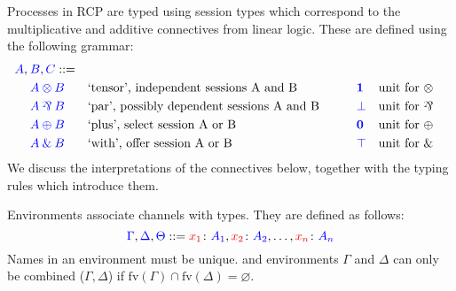 \documentclass[a4paper,UKenglish]{lipics-v2016}
\begin{document}
Processes in RCP are typed using session types which correspond to the
multiplicative and additive connectives from linear logic. These are defined
using the following grammar:
\[
  \begin{aligned}
    \blue{A},\:&\blue{B},\blue{C} ::=\\
    &       \tm{A \tens B} &&\text{`tensor', independent sessions A and B}
    &\qquad&\tm{\one}      &&\text{unit for \tens}\\
    &       \tm{A \parr B} &&\text{`par', possibly dependent sessions A and B}
    &\qquad&\tm{\bot}      &&\text{unit for \parr}\\
    &       \tm{A \plus B} &&\text{`plus', select session A or B}
    &\qquad&\tm{\nil}      &&\text{unit for \plus}\\
    &       \tm{A \with B} &&\text{`with', offer session A or B}
    &\qquad&\tm{\top}      &&\text{unit for \with}
  \end{aligned}
\]
We discuss the interpretations of the connectives below, together with the
typing rules which introduce them.

Environments associate channels with types. They are defined as follows:
\[
  \blue{\Gamma},\blue{\Delta},\blue{\Theta} ::=
  \tm[x_1]{A_1},\tm[x_2]{A_2},\dots,\tm[x_n]{A_n}
\]
Names in an environment must be unique.
and environments $\Gamma$ and $\Delta$ can
only be combined ($\Gamma, \Delta$) if $\text{fv}(\Gamma) \cap
\text{fv}(\Delta) = \varnothing$.
\end{document}
